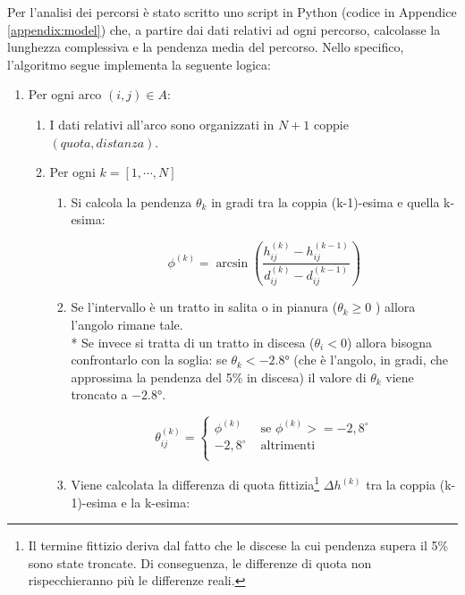 	Per l’analisi dei percorsi è stato scritto uno script in Python (codice in Appendice \ref{appendix:model}) che, a partire dai dati relativi ad ogni percorso, calcolasse la lunghezza complessiva e la pendenza media del percorso. Nello specifico, l'algoritmo segue implementa la seguente logica:

	\begin{enumerate}
	  \item Per ogni arco $(i,j) \in A:$
	  \begin{enumerate}
	    \item I dati relativi all’arco sono organizzati in $N+1$ coppie $(quota,distanza)$.
	    \item Per ogni $k = [1,\cdots,N]$
	    \begin{enumerate}
	    	\item Si calcola la pendenza $\theta_{k}$ in gradi tra la coppia (k-1)-esima e quella k-esima: 

	    	\begin{equation}
				\label{eq:angle_calculation}
				\phi^{(k)} = \arcsin \left(
					\frac{h_{ij}^{(k)} - h_{ij}^{(k-1)}}
						{d_{ij}^{(k)} - d_{ij}^{(k-1)}}
					\right)
			\end{equation}

			\item Se l’intervallo è un tratto in salita o in pianura ($\theta_{k} \geq 0$ ) allora l’angolo rimane tale.\\*
			Se invece si tratta di un tratto in discesa ($\theta_{i} < 0$) allora bisogna confrontarlo con la soglia: se $\theta_{k} < -2.8$° (che è l’angolo, in gradi, che approssima la pendenza del 5\% in discesa) il valore di $\theta_{k}$ viene troncato a $-2.8$°.

			\begin{equation}
				\label{eq:slope_assignment}
				\theta_{ij}^{(k)} = 
					\begin{cases}
						\phi^{(k)}	&	\text{ se } \phi^{(k)} >= -2,8^\circ \\
						-2,8^\circ	&	\text{ altrimenti } \\
					\end{cases}
			\end{equation}

			\item Viene calcolata la differenza di quota fittizia\footnote{Il termine fittizio deriva dal fatto che le discese la cui pendenza supera il 5\% sono state troncate. Di conseguenza, le differenze di quota non rispecchieranno più le differenze reali.} $\Delta h^{(k)}$ tra la coppia (k-1)-esima e la k-esima:


\end{enumerate}
\end{enumerate}
\end{enumerate}
